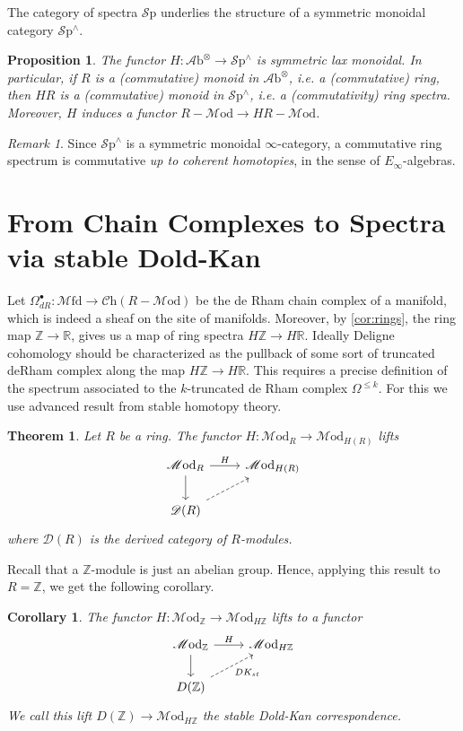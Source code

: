 \documentclass[10pt]{amsart}
\newcommand{\D}{\mathscr{D}}
\newcommand{\bR}{\mathbb{R}}
\newcommand{\bZ}{\mathbb{Z}}
\newcommand{\Sp}{\mathscr{S}\mathrm{p}}
\newcommand{\Ch}{\mathscr{C}\mathrm{h}}
\newcommand{\Mfd}{\mathscr{M}\mathrm{fd}}
\newcommand{\Mod}{\mathscr{M}\mathrm{od}}
\newcommand{\Ab}{\mathscr{A}\mathrm{b}}
\newtheorem{theorem}[equation]{Theorem}
\newtheorem{proposition}[equation]{Proposition}
\newtheorem{corollary}[equation]{Corollary}
\theoremstyle{definition}
\theoremstyle{remark}
\newtheorem{remark}[equation]{Remark}
\begin{document}
The category of spectra $\Sp$ underlies the structure of a symmetric monoidal category $\Sp^\wedge$.
\begin{proposition}
  The functor $H\colon \Ab^\otimes\to\Sp^\wedge$ is symmetric lax monoidal. In particular, if $R$ is a (commutative) monoid in $\Ab^\otimes$, i.e. a (commutative) ring, then $HR$ is a (commutative) monoid in $\Sp^\wedge$, i.e. a (commutativity) ring spectra. Moreover, $H$ induces a functor $R-\Mod\to HR-\Mod$.  
\end{proposition}
\begin{remark}
  Since $\Sp^\wedge$ is a symmetric monoidal $\infty$-category, a commutative ring spectrum is commutative \emph{up to coherent homotopies}, in the sense of $E_\infty$-algebras.
\end{remark}
\section{From Chain Complexes to Spectra via stable Dold-Kan}
Let $\Omega^\bullet_{dR}\colon \Mfd \to \Ch(R-\Mod)$ be the de Rham chain complex of a manifold, which is indeed a sheaf on the site of manifolds. Moreover, by \cref{cor:rings}, the ring map $\bZ \to \bR$, gives us a map of ring spectra $H\bZ \to H\bR$. Ideally Deligne cohomology should be characterized as the pullback of some sort of truncated deRham complex along the map $H\bZ \to H\bR$. This requires a precise definition of the spectrum associated to the $k$-truncated de Rham complex $\Omega^{\leq k}$. For this we use advanced result from stable homotopy theory.

\begin{theorem}
Let $R$ be a ring. The functor $H\colon \Mod_{R} \to \Mod_{H(R)}$ lifts
\[
\begin{tikzcd}
 \Mod_R \arrow[r, "H"] \arrow[d] & \Mod_{H(R)} \\
 \D(R) \arrow[ur, dashed]
\end{tikzcd}
\]
where $\D(R)$ is the derived category of $R$-modules.
\end{theorem}

Recall that a $\bZ$-module is just an abelian group. Hence, applying this result to $R = \bZ$, we get the following corollary.

\begin{corollary}
  The functor $H\colon \Mod_{\bZ} \to \Mod_{H\bZ}$ lifts to a functor
  \[
  \begin{tikzcd}
    \Mod_{\bZ} \arrow[r, "H"] \arrow[d] & \Mod_{H\bZ} \\
    D(\bZ) \arrow[ur, dashed, "DK_{st}"']
  \end{tikzcd}
  \]
  We call this lift $D(\bZ)\to \Mod_{H\bZ}$ the \emph{stable Dold-Kan correspondence}.
\end{corollary}
\end{document}
